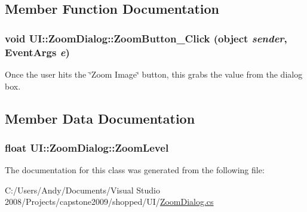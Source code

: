 \subsection{Member Function Documentation}
\hypertarget{class_u_i_1_1_zoom_dialog_a37e75e75f95e892bfcaa225107d5f0f7}{
\subsubsection[{ZoomButton\_\-Click}]{\setlength{\rightskip}{0pt plus 5cm}void UI::ZoomDialog::ZoomButton\_\-Click (object {\em sender}, \/  EventArgs {\em e})}}
\label{class_u_i_1_1_zoom_dialog_a37e75e75f95e892bfcaa225107d5f0f7}
Once the user hits the \char`\"{}Zoom Image\char`\"{} button, this grabs the value from the dialog box. 

\subsection{Member Data Documentation}
\hypertarget{class_u_i_1_1_zoom_dialog_a99f9c71d0231478132d8f0c4c708d4b1}{
\subsubsection[{ZoomLevel}]{\setlength{\rightskip}{0pt plus 5cm}float {\bf UI::ZoomDialog::ZoomLevel}}}
\label{class_u_i_1_1_zoom_dialog_a99f9c71d0231478132d8f0c4c708d4b1}


The documentation for this class was generated from the following file:\begin{DoxyCompactItemize}
\item 
C:/Users/Andy/Documents/Visual Studio 2008/Projects/capstone2009/shopped/UI/\hyperlink{_zoom_dialog_8cs}{ZoomDialog.cs}\end{DoxyCompactItemize}
